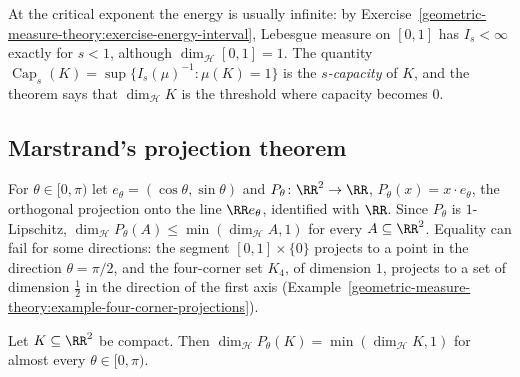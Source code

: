 At the critical exponent the energy is usually infinite: by Exercise~\ref{geometric-measure-theory:exercise-energy-interval}, Lebesgue measure on $[0, 1]$ has $I_s < \infty$ exactly for $s < 1$,
although $\dim_{\mathcal{H}}[0, 1] = 1$. The quantity
$\operatorname{Cap}_s(K) = \sup\{I_s(\mu)^{-1} : \mu(K) = 1\}$ is the \emph{$s$-capacity} of $K$, and the theorem says that $\dim_{\mathcal{H}}K$ is the threshold where capacity becomes $0$.

\subsection{Marstrand's projection theorem}\label{geometric-measure-theory:subsection-marstrand}

For $\theta \in [0, \pi)$ let $e_\theta = (\cos\theta, \sin\theta)$ and $P_\theta \colon \RR^2 \to \RR$, $P_\theta(x) = x \cdot e_\theta$, the orthogonal projection onto the line $\RR e_\theta$, identified with $\RR$.
Since $P_\theta$ is $1$-Lipschitz, $\dim_{\mathcal{H}}P_\theta(A) \leq \min(\dim_{\mathcal{H}}A, 1)$ for every $A \subseteq \RR^2$. Equality can fail for some directions: the segment $[0, 1] \times \{0\}$ projects to a
point in the direction $\theta = \pi/2$, and the four-corner set $K_4$, of dimension $1$, projects to a set of dimension $\frac12$ in the direction of the first axis
(Example~\ref{geometric-measure-theory:example-four-corner-projections}).

\begin{theorem}[Marstrand]\label{geometric-measure-theory:theorem-marstrand}
Let $K \subseteq \RR^2$ be compact. Then $\dim_{\mathcal{H}}P_\theta(K) = \min(\dim_{\mathcal{H}}K, 1)$ for almost every $\theta \in [0, \pi)$.
\end{theorem}

